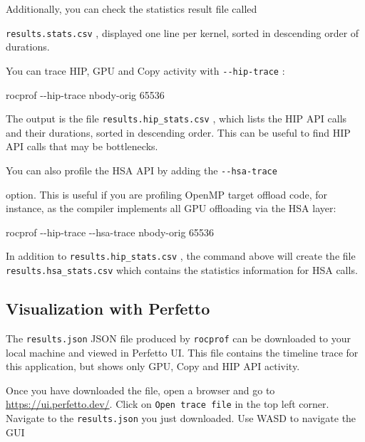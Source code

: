 \documentclass[
]{article}
\let\oldtexttt\texttt
\renewcommand{\texttt}[1]{
  \colorbox{Light}{\oldtexttt{#1}}
}
\newenvironment{Shaded}{}{}
\newcommand{\ExtensionTok}[1]{#1}
\newcommand{\NormalTok}[1]{#1}
\begin{document}
Additionally, you can check the statistics result file called
\texttt{results.stats.csv}, displayed one line per kernel, sorted in
descending order of durations.

You can trace HIP, GPU and Copy activity with \texttt{-\/-hip-trace}:

\begin{Shaded}
\begin{Highlighting}[]
\ExtensionTok{rocprof}\NormalTok{ {-}{-}hip{-}trace nbody{-}orig 65536}
\end{Highlighting}
\end{Shaded}

The output is the file \texttt{results.hip\_stats.csv}, which lists the
HIP API calls and their durations, sorted in descending order. This can
be useful to find HIP API calls that may be bottlenecks.

You can also profile the HSA API by adding the \texttt{-\/-hsa-trace}
option. This is useful if you are profiling OpenMP target offload code,
for instance, as the compiler implements all GPU offloading via the HSA
layer:

\begin{Shaded}
\begin{Highlighting}[]
\ExtensionTok{rocprof}\NormalTok{ {-}{-}hip{-}trace {-}{-}hsa{-}trace nbody{-}orig 65536}
\end{Highlighting}
\end{Shaded}

In addition to\texttt{results.hip\_stats.csv}, the command above will
create the file \texttt{results.hsa\_stats.csv} which contains the
statistics information for HSA calls.

\hypertarget{visualization-with-perfetto}{%
\subsection{Visualization with
Perfetto}\label{visualization-with-perfetto}}

The \texttt{results.json} JSON file produced by \texttt{rocprof} can be
downloaded to your local machine and viewed in Perfetto UI. This file
contains the timeline trace for this application, but shows only GPU,
Copy and HIP API activity.

Once you have downloaded the file, open a browser and go to
\url{https://ui.perfetto.dev/}. Click on \texttt{Open\ trace\ file} in
the top left corner. Navigate to the \texttt{results.json} you just
downloaded. Use WASD to navigate the GUI
\end{document}
